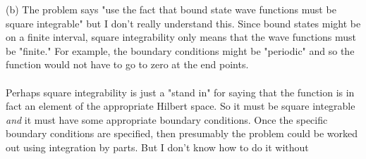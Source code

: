 \documentclass{article}
\begin{document}
\pagebreak
\begin{comment}
(b) We are talking about {\it bound states} here. So it seems like I can't
    just say that $\psi_1$ and $\psi_2$ must go to zero at the endpoints
    in order to be square integrable. For example, they might be defined
    on, say, the interval $[0,1]$ in which case they would be square
    integrable as long as they are everywhere finite.
    \\\\
    However, I suppose the concept of
    a "bound" state implies that the wave function is restricted to within
    the boundary, and hence must go to zero at the boundary.
    So assuming that $\psi_1$ and $\psi_2$ {\it do} 
    go to zero at the endpoints, then the only way that either of the
    terms of (1) would not go to zero would be if one of the derivatives
    increased without bound. That clearly couldn't happen,
    {\it if the function is continuous}, or else the
    function itself would never settle down to zero. {\it I suppose, if
    you were to take an infinite well, and say that the initial condition
    was constant inside the well but zero at the boundary, then you would
    have an infinite derivative. But the price would be a discontinuous
    wave function.}
\\\\
    In any event, for a physically realizable system it appears that
    the argument works.
\\\\
\end{comment}
(b) The problem says "use the fact that bound state wave functions must
    be square integrable" but I don't really understand this. Since bound
    states might be on a finite interval, square integrability only means
    that the wave functions must be "finite." For example, the boundary
    conditions might be "periodic" and so the function would not have to
    go to zero at the end points.
\\\\
    Perhaps square integrability is just a "stand in" for saying that
    the function is in fact an element of the appropriate Hilbert space.
    So it must be square integrable {\it and} it must have some
    appropriate boundary conditions. Once the specific boundary conditions
    are specified, then presumably the problem could be worked out
    using integration by parts. But I don't know how to do it without
\end{document}
